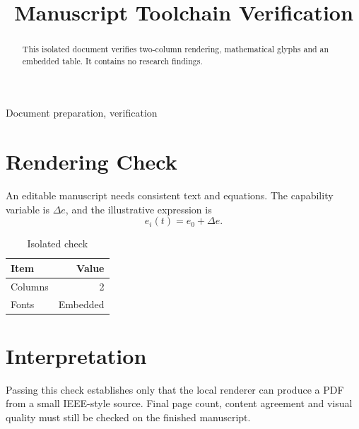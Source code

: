 \documentclass[conference,a4paper]{IEEEtran}
\begin{document}
\title{Manuscript Toolchain Verification}
\author{}
\maketitle
\begin{abstract}This isolated document verifies two-column rendering, mathematical glyphs and an embedded table. It contains no research findings.\end{abstract}
\begin{IEEEkeywords}Document preparation, verification\end{IEEEkeywords}
\section{Rendering Check}
An editable manuscript needs consistent text and equations. The capability variable is $\Delta e$, and the illustrative expression is
\begin{equation} e_i(t)=e_0+\Delta e.\end{equation}
\begin{table}[h]\centering\caption{Isolated check}\begin{tabular}{lr}\toprule Item&Value\\\midrule Columns&2\\Fonts&Embedded\\\bottomrule\end{tabular}\end{table}
\section{Interpretation}
Passing this check establishes only that the local renderer can produce a PDF from a small IEEE-style source. Final page count, content agreement and visual quality must still be checked on the finished manuscript.
\end{document}
